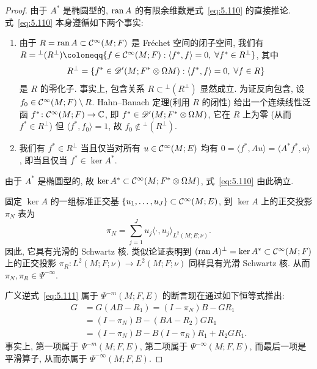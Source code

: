 \begin{proof}
由于 $A^*$ 是椭圆型的, $\operatorname{ran} A$ 的有限余维数是式~\eqref{eq:5.110} 的直接推论. 式~\eqref{eq:5.110} 本身遵循如下两个事实:
\begin{enumerate}
    \item[(i)] 由于 $R = \operatorname{ran} A \subset \mathcal{C}^\infty(M; F)$ 是 Fréchet 空间的闭子空间, 我们有 $R = {}^\perp(R^\perp) \defeq \{f \in \Smooth(M; F) : \langle f^*, f \rangle = 0, \; \forall f^* \in R^\perp\}$, 其中
        \begin{equation}\label{eq:5.118}
            R^\perp = \left\{ f^* \in \mathscr{D}'(M; F^* \otimes \Omega M) : \langle f^*, f \rangle = 0, \; \forall f \in R \right\}
        \end{equation}
        是 $R$ 的零化子. 事实上, 包含关系 $R \subset {}^\perp(R^\perp)$ 显然成立. 为证反向包含, 设 $f_0 \in \mathcal{C}^\infty(M; F) \setminus R$. Hahn--Banach 定理(利用 $R$ 的闭性) 给出一个连续线性泛函 $f^* \colon \mathcal{C}^\infty(M; F) \to \mathbb{C}$, 即 $f^* \in \mathscr{D}'(M; F^* \otimes \Omega M)$, 它在 $R$ 上为零 (从而 $f^* \in R^\perp$) 但 $\langle f^*, f_0 \rangle = 1$, 故 $f_0 \notin {}^\perp(R^\perp)$.
    \item[(ii)] 我们有 $f^* \in R^\perp$ 当且仅当对所有 $u \in \mathcal{C}^\infty(M; E)$ 均有 $0 = \langle f^*, A u \rangle = \langle A^* f^*, u \rangle$, 即当且仅当 $f^* \in \ker A^*$.
\end{enumerate}
由于 $A^*$ 是椭圆型的, 故 $\ker A^* \subset \mathcal{C}^\infty(M; F^* \otimes \Omega M)$, 式~\eqref{eq:5.110} 由此确立.

固定 $\ker A$ 的一组标准正交基 $\{u_1, \ldots, u_J\} \subset \mathcal{C}^\infty(M; E)$, 到 $\ker A$ 上的正交投影 $\pi_N$ 表为
\begin{equation}\label{eq:5.119}
    \pi_N = \sum_{j=1}^J u_j \langle \cdot, u_j \rangle_{L^2(M; E; \nu)}.
\end{equation}
因此, 它具有光滑的 Schwartz 核. 类似论证表明到 $(\operatorname{ran} A)^\perp = \ker A^* \subset \mathcal{C}^\infty(M; F)$ 上的正交投影 $\pi_R \colon L^2(M; F; \nu) \to L^2(M; F; \nu)$ 同样具有光滑 Schwartz 核. 从而 $\pi_N, \pi_R \in \Psi^{-\infty}$.

广义逆式~\eqref{eq:5.111} 属于 $\Psi^{-m}(M; F, E)$ 的断言现在通过如下恒等式推出:
\begin{equation}\label{eq:5.120}
    \begin{aligned}
        G &= G(A B - R_1) = (I - \pi_N) B - G R_1 \\
        &= (I - \pi_N) B - (B A - R_2) G R_1 \\
        &= (I - \pi_N) B - B(I - \pi_R) R_1 + R_2 G R_1.
    \end{aligned}
\end{equation}
事实上, 第一项属于 $\Psi^{-m}(M; F, E)$, 第二项属于 $\Psi^{-\infty}(M; F, E)$, 而最后一项是平滑算子, 从而亦属于 $\Psi^{-\infty}(M; F, E)$.
\end{proof}

